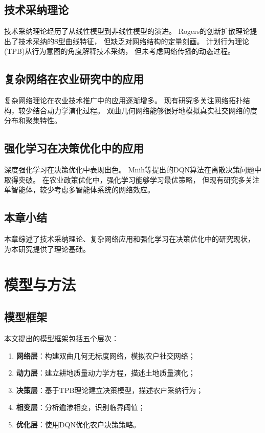 \documentclass[12pt,a4paper]{article}
\numberwithin{equation}{section}
\begin{document}
\subsection{技术采纳理论}

技术采纳理论经历了从线性模型到非线性模型的演进。
Rogers的创新扩散理论提出了技术采纳的S型曲线特征，
但缺乏对网络结构的定量刻画。
计划行为理论(TPB)从行为意图的角度解释技术采纳，
但未考虑网络传播的动态过程。

\subsection{复杂网络在农业研究中的应用}

复杂网络理论在农业技术推广中的应用逐渐增多。
现有研究多关注网络拓扑结构，较少结合动力学演化过程。
双曲几何网络能够很好地模拟真实社交网络的度分布和聚集特性。

\subsection{强化学习在决策优化中的应用}

深度强化学习在决策优化中表现出色。
Mnih等提出的DQN算法在离散决策问题中取得突破。
在农业政策优化中，强化学习能够学习最优策略，
但现有研究多关注单智能体，较少考虑多智能体系统的网络效应。

\subsection{本章小结}

本章综述了技术采纳理论、复杂网络应用和强化学习在决策优化中的研究现状，
为本研究提供了理论基础。

\newpage

\section{模型与方法}

\subsection{模型框架}

本文提出的模型框架包括五个层次：
\begin{enumerate}
    \item \textbf{网络层}：构建双曲几何无标度网络，模拟农户社交网络；
    \item \textbf{动力层}：建立耕地质量动力学方程，描述土地质量演化；
    \item \textbf{决策层}：基于TPB理论建立决策模型，描述农户采纳行为；
    \item \textbf{相变层}：分析逾渗相变，识别临界阈值；
    \item \textbf{优化层}：使用DQN优化农户决策策略。
\end{enumerate}
\end{document}
